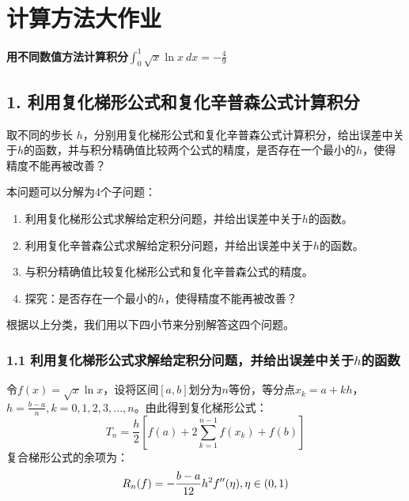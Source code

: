 
\chapter{计算方法大作业}
\begin{center}
    \textbf{用不同数值方法计算积分$\int_{0}^{1} \sqrt{x} \ln x  \ dx = -\frac{4}{9}$}
\end{center}

\section*{1. 利用复化梯形公式和复化辛普森公式计算积分}

取不同的步长 $h$，分别用复化梯形公式和复化辛普森公式计算积分，给出误差中关于$h$的函数，并与积分精确值比较两个公式的精度，是否存在一个最小的$h$，使得精度不能再被改善？

本问题可以分解为4个子问题：
\begin{enumerate}
    \item 利用复化梯形公式求解给定积分问题，并给出误差中关于$h$的函数。
    \item 利用复化辛普森公式求解给定积分问题，并给出误差中关于$h$的函数。
    \item 与积分精确值比较复化梯形公式和复化辛普森公式的精度。
    \item 探究：是否存在一个最小的$h$，使得精度不能再被改善？
\end{enumerate}

根据以上分类，我们用以下四小节来分别解答这四个问题。

\subsection*{1.1 利用复化梯形公式求解给定积分问题，并给出误差中关于$h$的函数}

令$f(x) = \sqrt{x} \ln x$，设将区间$[a,b]$划分为$n$等份，等分点$x_k = a + kh$，$h = \frac{b-a}{n},k=0,1,2,3,...,n$。由此得到复化梯形公式：
\begin{equation}
    T_n = \frac{h}{2} [f(a) + 2\sum_{k=1}^{n-1} f(x_k) + f(b) ]
    \label{eq:compound_trapezoid_general}
\end{equation}
复合梯形公式的余项为：
\begin{equation}
    R_n(f) = -\frac{b-a}{12} h^2 f^{\prime\prime} (\eta), \\ \eta\in(0,1)
    \label{eq:compound_trapezoid_R_general}
\end{equation}

